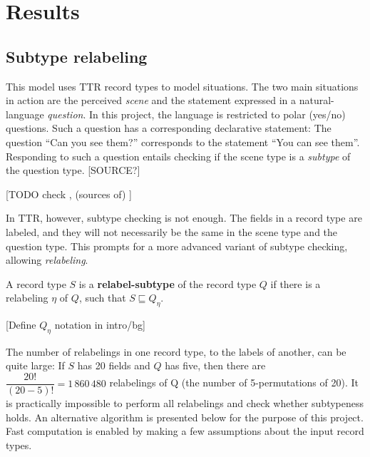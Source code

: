 \section{Results}
\label{sec:results}





\subsection{Subtype relabeling}

This model uses TTR record types to model situations.
The two main situations in action are the perceived \textit{scene} and the statement expressed in a natural-language \textit{question}.
In this project, the language is restricted to polar (yes/no) questions.
Such a question has a corresponding declarative statement:
The question ``Can you see them?'' corresponds to the statement ``You can see them''.
Responding to such a question entails checking if the scene type is a \textit{subtype} of the question type.
[SOURCE?]

[TODO check \cite{RooyPolarQuestions2003}, (sources of) \cite{AloniQuantificationConceptualCovers2001}]

In TTR, however, subtype checking is not enough.
The fields in a record type are labeled, and they will not necessarily be the same in the scene type and the question type.
This prompts for a more advanced variant of subtype checking, allowing \textit{relabeling}.

\begin{definition}
A record type $S$ is a \textbf{relabel-subtype} of the record type $Q$ if there is a relabeling $\eta$ of $Q$, such that $S \sqsubseteq Q_\eta$.
\end{definition}

[Define $Q_\eta$ notation in intro/bg]

The number of relabelings in one record type, to the labels of another, can be quite large:
If $S$ has 20 fields and $Q$ has five, then there are $\dfrac{20!}{(20-5)!} = 1\,860\,480$ relabelings of Q (the number of 5-permutations of 20).
It is practically impossible to perform all relabelings and check whether subtypeness holds.
An alternative algorithm is presented below for the purpose of this project.
Fast computation is enabled by making a few assumptions about the input record types.



